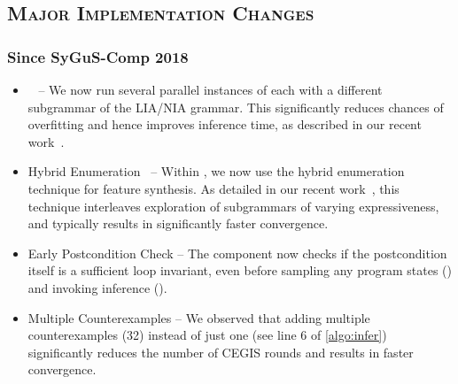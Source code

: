 \documentclass[conference]{IEEEtran}
\begin{document}
\subsection*{\textsc{Major Implementation Changes}}

\subsubsection*{Since SyGuS-Comp 2018}
\begin{itemize}
    \item {}~\citep{Padhi2019OverfittingSTP} --
          We now run several parallel instances of \Infer each with a different subgrammar of the LIA/NIA grammar.
          This significantly reduces chances of overfitting and hence improves inference time,
          as described in our recent work~\cite{Padhi2019OverfittingSTP}.

    \item Hybrid Enumeration~\citep{Padhi2019OverfittingSTP} --
          Within \PIE, we now use the hybrid enumeration technique for feature synthesis.
          As detailed in our recent work~\cite{Padhi2019OverfittingSTP},
          this technique interleaves exploration of subgrammars of varying expressiveness,
          and typically results in significantly faster convergence.

    \item Early Postcondition Check --
          The \Process{} component now checks if the postcondition itself is a sufficient loop invariant,
          even before sampling any program states (\Record) and invoking inference (\Infer).

    \item Multiple Counterexamples --
          We observed that adding multiple counterexamples (32) instead of just one (see line 6 of \cref{algo:infer})
          significantly reduces the number of CEGIS rounds and results in faster convergence.
\end{itemize}
\end{document}
